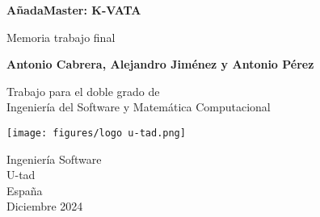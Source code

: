 \documentclass{report}
\begin{document}
\begin{titlepage}
    \begin{center}
        \vspace*{1cm}
 
        \Large\textbf{AñadaMaster: K-VATA}
 
        \vspace{0.5cm}
            Memoria trabajo final
        \vspace{1.5cm}
 
        \textbf{Antonio Cabrera, Alejandro Jiménez y Antonio Pérez}
 
        \vfill
             
        Trabajo para el doble grado de\\
        Ingeniería del Software y Matemática Computacional\\
             
        \vspace{0.8cm}
      
        \texttt{[image: figures/logo u-tad.png]}
             
        Ingeniería Software\\
        U-tad\\
        España\\
        Diciembre 2024
             
    \end{center}
 \end{titlepage}

\tableofcontents

\listoffigures














\end{document}
